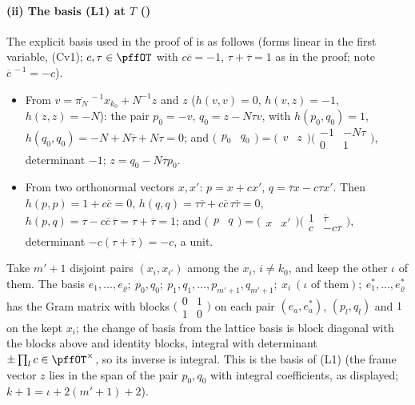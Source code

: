 \documentclass[10pt]{amsart}
\theoremstyle{definition}
\theoremstyle{remark}
\providecommand{\aubar}[1]{\overline{#1}}
\begin{document}
\paragraph*{(ii) The basis \textup{(L1)} at $T$ ({\cite[Lemma~5.13]{P52}})}
The explicit basis used in the proof of {\cite[Lemma~5.13]{P52}} is as follows (forms linear in the first variable, (Cv1); $c,\tau\in\pffOT$ with
$c\aubar c=-1$, $\tau+\aubar\tau=1$ as in the proof; note $\aubar c^{\,-1}=-c$).
\begin{itemize}
\item From $v=\aubar{\pi_N}^{\,-1}x_{k_0}+N^{-1}z$ and $z$ ($h(v,v)=0$, $h(v,z)=-1$, $h(z,z)=-N$): the pair
$p_0=-v$, $q_0=z-N\tau v$, with $h(p_0,q_0)=1$, $h(q_0,q_0)=-N+N\aubar\tau+N\tau=0$; and
$\bigl(\begin{smallmatrix}p_0&q_0\end{smallmatrix}\bigr)=\bigl(\begin{smallmatrix}v&z\end{smallmatrix}\bigr)
\bigl(\begin{smallmatrix}-1&-N\tau\\0&1\end{smallmatrix}\bigr)$, determinant $-1$; $z=q_0-N\tau p_0$.
\item From two orthonormal vectors $x,x'$: $p=x+cx'$, $q=\aubar\tau x-c\tau x'$. Then $h(p,p)=1+c\aubar c=0$,
$h(q,q)=\tau\aubar\tau+c\aubar c\,\tau\aubar\tau=0$, $h(p,q)=\tau-c\aubar c\,\aubar\tau=\tau+\aubar\tau=1$; and
$\bigl(\begin{smallmatrix}p&q\end{smallmatrix}\bigr)=\bigl(\begin{smallmatrix}x&x'\end{smallmatrix}\bigr)
\bigl(\begin{smallmatrix}1&\aubar\tau\\c&-c\tau\end{smallmatrix}\bigr)$, determinant $-c(\tau+\aubar\tau)=-c$, a unit.
\end{itemize}
Take $m'+1$ disjoint pairs $(x_{i},x_{i'})$ among the $x_i$, $i\ne k_0$, and keep the other $\iota$ of them.
The basis $e_1,\dots,e_\varrho;\ p_0,q_0;\ p_1,q_1,\dots,p_{m'+1},q_{m'+1};\ x_i\ (\iota\text{ of them});\
e_1^*,\dots,e_\varrho^*$ has the Gram matrix with blocks $\bigl(\begin{smallmatrix}0&1\\1&0\end{smallmatrix}\bigr)$ on
each pair $(e_a,e_a^*)$, $(p_l,q_l)$ and $1$ on the kept $x_i$; the change of basis from the lattice basis is
block diagonal with the blocks above and identity blocks, integral with determinant $\pm\prod_l c\in
\pffOT^\times$, so its inverse is integral. This is the basis of (L1) (the frame vector $z$ lies in the span
of the pair $p_0,q_0$ with integral coefficients, as displayed; $k+1=\iota+2(m'+1)+2$).
\end{document}
